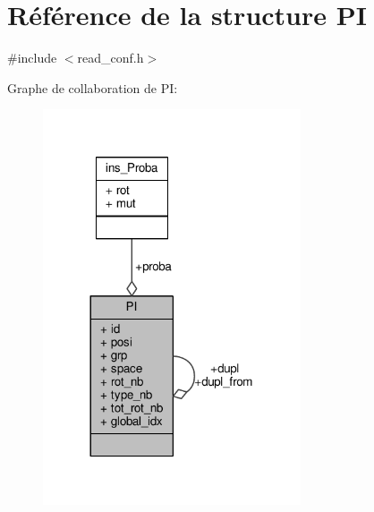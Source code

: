 \hypertarget{struct_p_i}{\section{Référence de la structure P\+I}
\label{struct_p_i}
}


{\ttfamily \#include $<$read\+\_\+conf.\+h$>$}



Graphe de collaboration de P\+I\+:\nopagebreak
\begin{figure}[H]
\begin{center}
\leavevmode
\includegraphics[width=216pt]{struct_p_i__coll__graph}
\end{center}
\end{figure}
